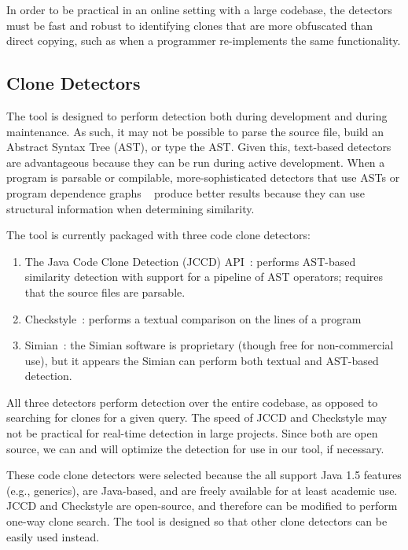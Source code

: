 \documentclass[preprint,10pt]{sigplanconf}
\begin{document}
In order to be practical in an online
setting with a large codebase, the detectors must be
fast and
robust to identifying clones that are more obfuscated than direct
copying, such as when a programmer re-implements the same
functionality.

\subsection{Clone Detectors}
The tool is designed to perform detection both during development and
during maintenance.  As such, it may not be possible to parse the source
file, build an Abstract Syntax Tree (AST), or type the AST. Given this, text-based detectors
are advantageous because they can be run during active
development. When a program is parsable or compilable,
more-sophisticated detectors that use ASTs or program
dependence graphs ~\cite{LiE2011} produce better results
because they can use structural information when determining
similarity.

\label{sec:detectors}
The tool is currently packaged with three code clone detectors:

\begin{enumerate}
\item The Java Code Clone Detection (JCCD) API~\cite{JCCD}: performs
  AST-based similarity detection with support for a pipeline of AST
  operators; requires that the source files are parsable.
\item Checkstyle~\cite{CheckStyle}: performs a textual comparison on
  the lines of a program
\item Simian~\cite{Simian}: the Simian software is proprietary (though
  free for non-commercial use), but it appears the Simian can perform
  both textual and AST-based detection.
\end{enumerate}

All three detectors perform detection over the entire codebase, as
opposed to searching for clones for a given query. The speed of JCCD
and Checkstyle may not be practical for real-time detection in large
projects. Since both are open source, we can and will optimize the
detection for use in our tool, if necessary.  

These code clone detectors were selected because the all support Java
1.5 features (e.g., generics), are Java-based, and are freely
available for at least academic use. JCCD and Checkstyle are
open-source, and therefore can be modified to perform one-way clone
search. 
The tool is designed so that other clone detectors can be easily used instead.
\end{document}
